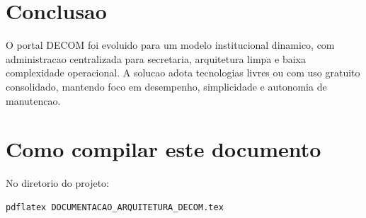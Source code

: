 \documentclass[12pt,a4paper]{article}
\begin{document}
\section{Conclusao}
O portal DECOM foi evoluido para um modelo institucional dinamico, com administracao centralizada para secretaria, arquitetura limpa e baixa complexidade operacional. A solucao adota tecnologias livres ou com uso gratuito consolidado, mantendo foco em desempenho, simplicidade e autonomia de manutencao.

\section*{Como compilar este documento}
No diretorio do projeto:
\begin{verbatim}
pdflatex DOCUMENTACAO_ARQUITETURA_DECOM.tex
\end{verbatim}
\end{document}
